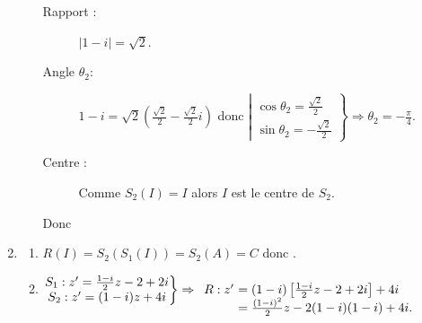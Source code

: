 \begin{description}
\begin{enumerate}
\begin{enumerate}
											\vspace{-1\baselineskip}
												\begin{description}
													\item[Rapport :] $|1-i| = \sqrt{2}$.
													\item[Angle $\theta_2$:] 
														$1-i = \sqrt{2} \left( \frac{\sqrt{2}}{2} - \frac{\sqrt{2}}{2} i\right)$ donc
														$\left|
															\begin{matrix}
																\cos \theta_2 = \frac{\sqrt{2}}{2}	\\
																\sin \theta_2 = -\frac{\sqrt{2}}{2}	
															\end{matrix}
														\right\rbrace
														\Rightarrow
														\theta_2 = -\frac{\pi}{4}.
														$
													\item[Centre :] Comme $S_2(I) = I$ alors $I$ est le centre de $S_2$.
												\end{description}
												Donc 
								\end{enumerate}
						\item 
								\begin{enumerate}
									\item {}
												$R(I) = S_2 \left( S_1(I) \right) = S_2 (A) = C$ donc .
									\item {}
												$
													\left.
														\begin{matrix}
															S_1 : z' = \frac{1-i}{2}z -2 + 2i \\
															S_2 : z' = (1-i) z + 4 i
														\end{matrix}
													\right\rbrace
													\Rightarrow
														\begin{array}[t]{l@{\ }l}
															R : z'	& = (1-i) \left[ \frac{1-i}{2}z -2 + 2i \right] + 4i		\\
																	& = \frac{(1-i)^2}{2} z -2 (1-i) (1-i) + 4i					.
														\end{array}
												$
												

\end{enumerate}
\end{enumerate}
\end{description}
